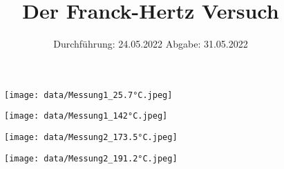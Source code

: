 

\subject{V601}
\title{Der Franck-Hertz Versuch}
\date{%
  Durchführung: 24.05.2022
  \hspace{3em}
  Abgabe: 31.05.2022
}



\maketitle
\thispagestyle{empty}
\tableofcontents
\newpage







\printbibliography{}

\begin{figure}
  \centering
  \texttt{[image: data/Messung1\_25.7°C.jpeg]}
\end{figure}

\begin{figure}
  \centering
  \texttt{[image: data/Messung1\_142°C.jpeg]}
\end{figure}

\begin{figure}
  \centering
  \texttt{[image: data/Messung2\_173.5°C.jpeg]}
\end{figure}

\begin{figure}
  \centering
  \texttt{[image: data/Messung2\_191.2°C.jpeg]}
\end{figure}


